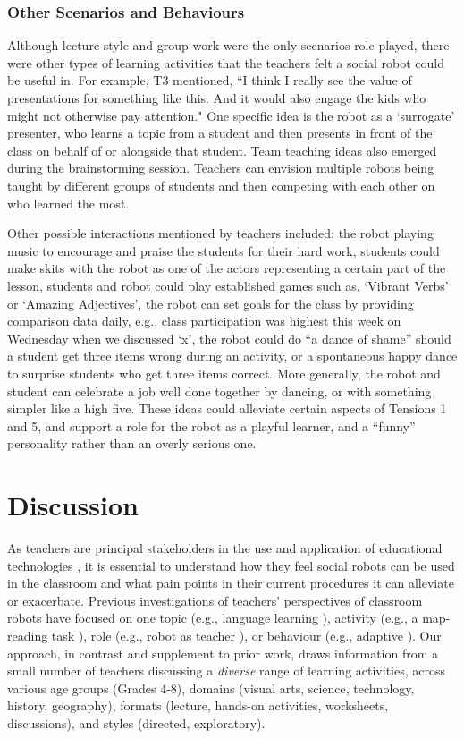 \subsubsection{Other Scenarios and Behaviours}
\label{sec:19}
Although lecture-style and group-work were the only scenarios role-played, there were other types of learning activities that the teachers felt a social robot could be useful in. For example, T3 mentioned, ``I think I really see the value of presentations for something like this. And it would also engage the kids who might not otherwise pay attention." One specific idea is the robot as a `surrogate' presenter, who learns a topic from a student and then presents in front of the class on behalf of or alongside that student.  Team teaching ideas also emerged during the brainstorming session. Teachers can envision multiple robots being taught by different groups of students and then competing with each other on who learned the most. 

Other possible interactions mentioned by teachers included: the robot playing music to encourage and praise the students for their hard work, students could make skits with the robot as one of the actors representing a certain part of the lesson, students and robot could play established games such as, `Vibrant Verbs' or `Amazing Adjectives', the robot can set goals for the class by providing comparison data daily, e.g., class participation was highest this week on Wednesday when we discussed `x', the robot could do ``a dance of shame'' should a student get three items wrong during an activity, or a spontaneous happy dance to surprise students who get three items correct. More generally, the robot and student can celebrate a job well done together by dancing, or with something simpler like a high five. These ideas could alleviate certain aspects of Tensions 1 and 5, and support a role for the robot as a playful learner, and a ``funny'' personality rather than an overly serious one. 





\section{Discussion}
\label{sec:20}


As teachers are principal stakeholders in the use and application of educational technologies \cite{nordkvelle2005visions}, it is essential to understand how they feel social robots can be used in the classroom and what pain points in their current procedures it can alleviate or exacerbate. 
Previous investigations of teachers' perspectives of classroom robots have focused on one topic (e.g., language learning \cite{chang10}), activity (e.g., a map-reading task \cite{serholt2014teachers}), role (e.g., robot as teacher \cite{newton2019humanoid}), or behaviour (e.g., adaptive \cite{Ahmad2016}). Our approach, in contrast and supplement to prior work, draws information from a small number of teachers discussing a {\it diverse} range of learning activities, across various age groups (Grades 4-8), domains (visual arts, science, technology, history, geography), formats (lecture, hands-on activities, worksheets, discussions), and styles (directed, exploratory). 


